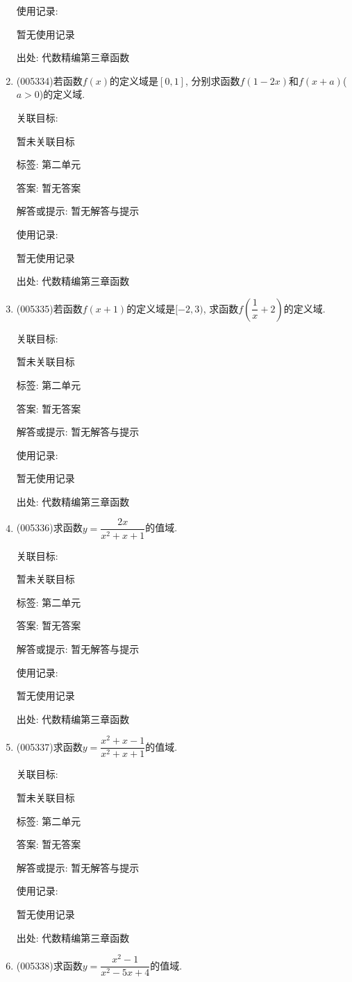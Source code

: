 \documentclass[10pt,a4paper]{article}
\begin{document}
\begin{enumerate}[1.]
使用记录:

暂无使用记录


出处: 代数精编第三章函数
\item { (005334)}若函数$f(x)$的定义域是$[0,1]$, 分别求函数$f(1-2x)$和$f(x+a)$($a>0$)的定义域.


关联目标:

暂未关联目标



标签: 第二单元

答案: 暂无答案

解答或提示: 暂无解答与提示

使用记录:

暂无使用记录


出处: 代数精编第三章函数
\item { (005335)}若函数$f(x+1)$的定义域是$[-2,3)$, 求函数$f(\dfrac 1x+2)$的定义域.


关联目标:

暂未关联目标



标签: 第二单元

答案: 暂无答案

解答或提示: 暂无解答与提示

使用记录:

暂无使用记录


出处: 代数精编第三章函数
\item { (005336)}求函数$y=\dfrac{2x}{x^2+x+1}$的值域.


关联目标:

暂未关联目标



标签: 第二单元

答案: 暂无答案

解答或提示: 暂无解答与提示

使用记录:

暂无使用记录


出处: 代数精编第三章函数
\item { (005337)}求函数$y=\dfrac{x^2+x-1}{x^2+x+1}$的值域.


关联目标:

暂未关联目标



标签: 第二单元

答案: 暂无答案

解答或提示: 暂无解答与提示

使用记录:

暂无使用记录


出处: 代数精编第三章函数
\item { (005338)}求函数$y=\dfrac{x^2-1}{x^2-5x+4}$的值域.



\end{enumerate}
\end{document}
